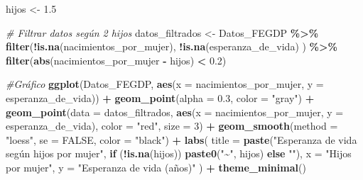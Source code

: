 \documentclass[
]{article}
\newenvironment{Shaded}{\begin{snugshade}}{\end{snugshade}}
\newcommand{\AttributeTok}[1]{\textcolor[rgb]{0.13,0.29,0.53}{#1}}
\newcommand{\CommentTok}[1]{\textcolor[rgb]{0.56,0.35,0.01}{\textit{#1}}}
\newcommand{\ConstantTok}[1]{\textcolor[rgb]{0.56,0.35,0.01}{#1}}
\newcommand{\ControlFlowTok}[1]{\textcolor[rgb]{0.13,0.29,0.53}{\textbf{#1}}}
\newcommand{\DecValTok}[1]{\textcolor[rgb]{0.00,0.00,0.81}{#1}}
\newcommand{\FloatTok}[1]{\textcolor[rgb]{0.00,0.00,0.81}{#1}}
\newcommand{\FunctionTok}[1]{\textcolor[rgb]{0.13,0.29,0.53}{\textbf{#1}}}
\newcommand{\NormalTok}[1]{#1}
\newcommand{\OtherTok}[1]{\textcolor[rgb]{0.56,0.35,0.01}{#1}}
\newcommand{\SpecialCharTok}[1]{\textcolor[rgb]{0.81,0.36,0.00}{\textbf{#1}}}
\newcommand{\StringTok}[1]{\textcolor[rgb]{0.31,0.60,0.02}{#1}}
\begin{document}
\begin{Shaded}
\begin{Highlighting}[]
\NormalTok{ hijos }\OtherTok{\textless{}{-}} \FloatTok{1.5}
  
  \CommentTok{\# Filtrar datos según 2 hijos}
\NormalTok{  datos\_filtrados }\OtherTok{\textless{}{-}}\NormalTok{ Datos\_FEGDP }\SpecialCharTok{\%\textgreater{}\%}
    \FunctionTok{filter}\NormalTok{(}\SpecialCharTok{!}\FunctionTok{is.na}\NormalTok{(nacimientos\_por\_mujer),}
      \SpecialCharTok{!}\FunctionTok{is.na}\NormalTok{(esperanza\_de\_vida)}
\NormalTok{    ) }\SpecialCharTok{\%\textgreater{}\%}
    \FunctionTok{filter}\NormalTok{(}\FunctionTok{abs}\NormalTok{(nacimientos\_por\_mujer }\SpecialCharTok{{-}}\NormalTok{ hijos) }\SpecialCharTok{\textless{}} \FloatTok{0.2}\NormalTok{)}

\CommentTok{\#Gráfico}
 \FunctionTok{ggplot}\NormalTok{(Datos\_FEGDP, }\FunctionTok{aes}\NormalTok{(}\AttributeTok{x =}\NormalTok{ nacimientos\_por\_mujer, }\AttributeTok{y =}\NormalTok{ esperanza\_de\_vida)) }\SpecialCharTok{+}
    \FunctionTok{geom\_point}\NormalTok{(}\AttributeTok{alpha =} \FloatTok{0.3}\NormalTok{, }\AttributeTok{color =} \StringTok{"gray"}\NormalTok{) }\SpecialCharTok{+}
    \FunctionTok{geom\_point}\NormalTok{(}\AttributeTok{data =}\NormalTok{ datos\_filtrados, }\FunctionTok{aes}\NormalTok{(}\AttributeTok{x =}\NormalTok{ nacimientos\_por\_mujer, }\AttributeTok{y =}\NormalTok{ esperanza\_de\_vida), }
               \AttributeTok{color =} \StringTok{"red"}\NormalTok{, }\AttributeTok{size =} \DecValTok{3}\NormalTok{) }\SpecialCharTok{+}
    \FunctionTok{geom\_smooth}\NormalTok{(}\AttributeTok{method =} \StringTok{"loess"}\NormalTok{, }\AttributeTok{se =} \ConstantTok{FALSE}\NormalTok{, }\AttributeTok{color =} \StringTok{"black"}\NormalTok{) }\SpecialCharTok{+}
    \FunctionTok{labs}\NormalTok{(}
      \AttributeTok{title =} \FunctionTok{paste}\NormalTok{(}\StringTok{"Esperanza de vida según hijos por mujer"}\NormalTok{,}
                    \ControlFlowTok{if}\NormalTok{ (}\SpecialCharTok{!}\FunctionTok{is.na}\NormalTok{(hijos)) }\FunctionTok{paste0}\NormalTok{(}\StringTok{"\textasciitilde{}"}\NormalTok{, hijos) }\ControlFlowTok{else} \StringTok{""}\NormalTok{),}
      \AttributeTok{x =} \StringTok{"Hijos por mujer"}\NormalTok{,}
      \AttributeTok{y =} \StringTok{"Esperanza de vida (años)"}
\NormalTok{    ) }\SpecialCharTok{+}
    \FunctionTok{theme\_minimal}\NormalTok{()}
\end{Highlighting}
\end{Shaded}
\end{document}
